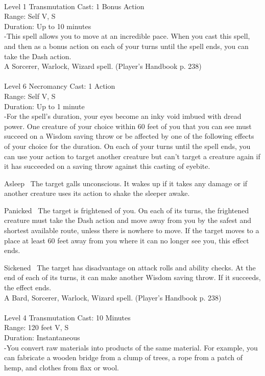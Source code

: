 \documentclass[10pt,twocolumn]{report}
\begin{document}
 \\
Level 1 \quad Transmutation \quad Cast: 1 Bonus Action\\
Range: Self \quad V, S\\
Duration: Up to 10 minutes \quad \\
-This spell allows you to move at an incredible pace. When you cast this spell, and then as a bonus action on each of your turns until the spell ends, you can take the Dash action.\\
A Sorcerer, Warlock, Wizard spell. (Player's Handbook p. 238) \\


 \\
Level 6 \quad Necromancy \quad Cast: 1 Action\\
Range: Self \quad V, S\\
Duration: Up to 1 minute \quad \\
-For the spell’s duration, your eyes become an inky void imbued with dread power. One creature of your choice within 60 feet of you that you can see must succeed on a Wisdom saving throw or be affected by one of the following effects of your choice for the duration. On each of your turns until the spell ends, you can use your action to target another creature but can’t target a creature again if it has succeeded on a saving throw against this casting of eyebite. 

Asleep 
The target galls unconscious. It wakes up if it takes any damage or if another creature uses its action to shake the sleeper awake. 

Panicked 
The target is frightened of you. On each of its turns, the frightened creature must take the Dash action and move away from you by the safest and shortest available route, unless there is nowhere to move. If the target moves to a place at least 60 feet away from you where it can no longer see you, this effect ends. 

Sickened 
The target has disadvantage on attack rolls and ability checks. At the end of each of its turns, it can make another Wisdom saving throw. If it succeeds, the effect ends.\\
A Bard, Sorcerer, Warlock, Wizard spell. (Player's Handbook p. 238) \\


 \\
Level 4 \quad Transmutation \quad Cast: 10 Minutes\\
Range: 120 feet \quad V, S\\
Duration: Instantaneous \quad \\
-You convert raw materials into products of the same material. 
For example, you can fabricate a wooden bridge from a clump of trees, a rope from a patch of hemp, and clothes from flax or wool. 
\end{document}

